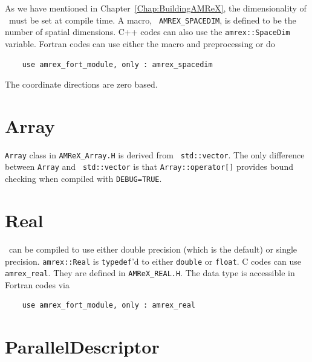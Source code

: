 As we have mentioned in Chapter~\ref{Chap:BuildingAMReX}, the
dimensionality of \amrex\ must be set at compile time.  A macro, {\tt
  AMREX\_SPACEDIM}, is defined to be the number of spatial
dimensions.  C++ codes can also use the {\tt amrex::SpaceDim}
variable.  Fortran codes can use either the macro and preprocessing or
do 
\begin{verbatim}
    use amrex_fort_module, only : amrex_spacedim
\end{verbatim}
The coordinate directions are zero based.

\section{Array}

{\tt Array} class in {\tt AMReX\_Array.H} is derived from {\tt
  std::vector}.  The only difference between {\tt Array} and {\tt
  std::vector} is that {\tt Array::operator[]} provides bound checking
when compiled with {\tt DEBUG=TRUE}.

\section{Real}

\amrex\ can be compiled to use either double precision (which is the
default) or single precision.  {\tt amrex::Real} is {\tt typedef}'d to
either {\tt double} or {\tt float}.  C codes can use {\tt
  amrex\_real}.  They are defined in {\tt AMReX\_REAL.H}.  The data
type is accessible in Fortran codes via
\begin{verbatim}
    use amrex_fort_module, only : amrex_real
\end{verbatim}

\section{ParallelDescriptor}
\label{sec:basics:paralleldescriptor}

